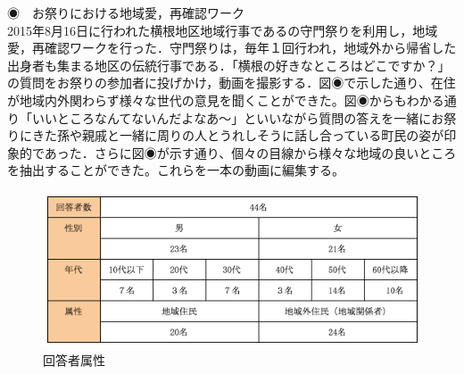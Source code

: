 \documentclass[a4paper]{jsarticle}
\begin{document}
\begin{itemize}


\subsubsubsection ◉　お祭りにおける地域愛，再確認ワーク\\
2015年8月16日に行われた横根地区地域行事であるの守門祭りを利用し，地域愛，再確認ワークを行った．守門祭りは，毎年１回行われ，地域外から帰省した出身者も集まる地区の伝統行事である．「横根の好きなところはどこですか？」の質問をお祭りの参加者に投げかけ，動画を撮影する．図◉で示した通り、在住が地域内外関わらず様々な世代の意見を聞くことができた。図◉からもわかる通り「いいところなんてないんだよなあ〜」といいながら質問の答えを一緒にお祭りにきた孫や親戚と一緒に周りの人とうれしそうに話し合っている町民の姿が印象的であった．さらに図◉が示す通り、個々の目線から様々な地域の良いところを抽出することができた。これらを一本の動画に編集する。

\begin{figure}[H]
  \begin{center}
    \includegraphics[width=0.8\hsize]{./images/21.png}
    \caption{回答者属性}
    \label{fig:tmu_hino}
  \end{center}
\end{figure}


\end{itemize}
\end{document}
